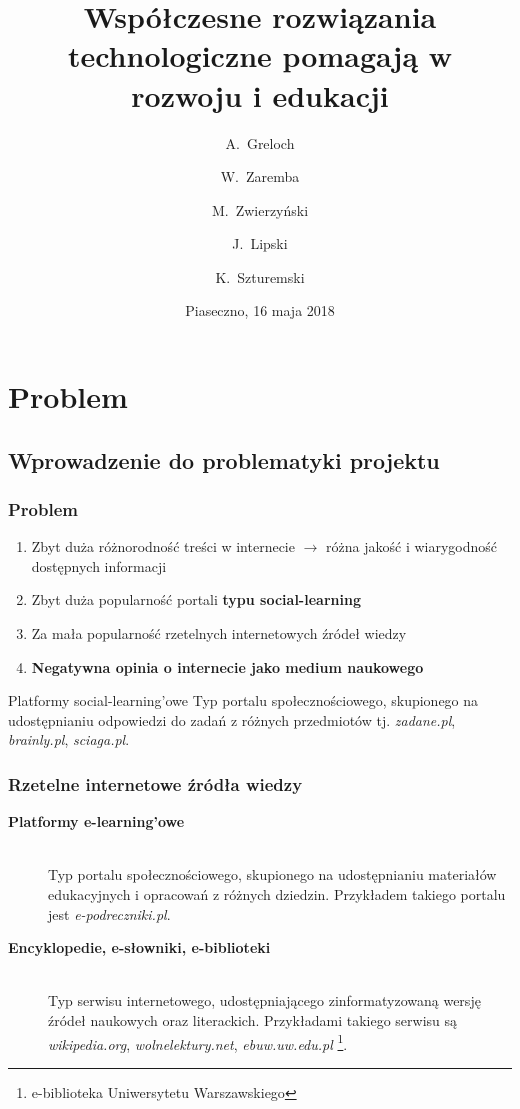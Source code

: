\documentclass[10pt]{beamer}
\title[]{Współczesne rozwiązania technologiczne pomagają w rozwoju i edukacji}
\author[A.~Greloch \and W.~Zaremba \and M.~Zwierzyński \and J.~Lipski \and K.~Szturemski]{A.~Greloch \and W.~Zaremba \and M.~Zwierzyński \and J.~Lipski \and K.~Szturemski}
\institute[G1PIA] %
{
  Klasa 3j\\
  Gimnazjum nr. 1 im. Powstańców Warszawy w Piasecznie
}
\date{Piaseczno, 16 maja 2018}
\begin{document}
\frame{\titlepage}

\section{Problem}
\subsection{Wprowadzenie do problematyki projektu}
\setcounter{subsection}{1}

\renewcommand{\arraystretch}{1.2}

\begin{frame}
  \frametitle{Problem}
  \begin{enumerate}
    \item Zbyt duża różnorodność treści w internecie $\rightarrow$ różna jakość i wiarygodność dostępnych informacji
    \item Zbyt duża popularność portali \textbf{typu social-learning}
    \item Za mała popularność rzetelnych internetowych źródeł wiedzy
    \item \textbf{Negatywna opinia o internecie jako medium naukowego}
  \end{enumerate}
  \begin{block}{Platformy social-learning'owe}
    Typ portalu społecznościowego, skupionego na udostępnianiu odpowiedzi do zadań z różnych przedmiotów tj. \emph{zadane.pl}, \emph{brainly.pl}, \emph{sciaga.pl}.
  \end{block}
\end{frame}

\begin{frame}
  \frametitle{Rzetelne internetowe źródła wiedzy}
  \small

  \begin{description}
    \item [\textbf{Platformy e-learning'owe}]\hfill\\ Typ portalu społecznościowego, skupionego na udostępnianiu materiałów edukacyjnych i opracowań z różnych dziedzin. Przykładem takiego portalu jest \emph{e-podreczniki.pl}.
    \item [\textbf{Encyklopedie, e-słowniki, e-biblioteki}]\hfill\\ Typ serwisu internetowego, udostępniającego zinformatyzowaną wersję źródeł naukowych oraz literackich. Przykładami takiego serwisu są \emph{wikipedia.org}, \emph{wolnelektury.net}, \emph{ebuw.uw.edu.pl} \footnote[frame]{e-biblioteka Uniwersytetu Warszawskiego}.
  \end{description}

\end{frame}
\end{document}
